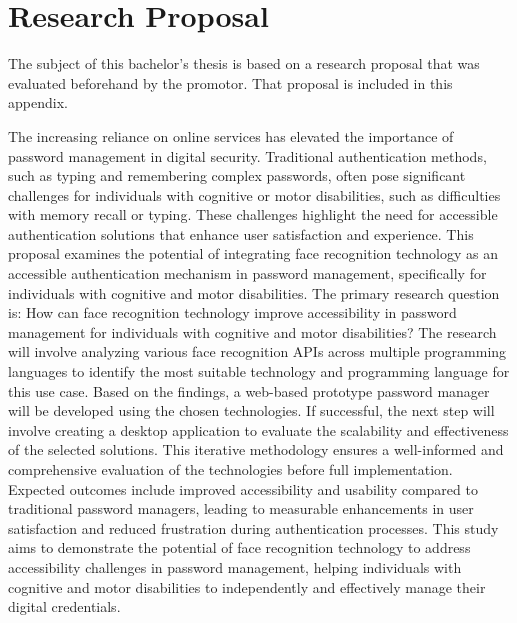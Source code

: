 \documentclass[english,dit,thesis]{hogentreport}
\begin{document}









\appendix

\chapter{Research Proposal}
The subject of this bachelor's thesis is based on a research proposal that was evaluated beforehand by the promotor. That proposal is included in this appendix.


    The increasing reliance on online services has elevated the importance of password management in digital security. Traditional authentication methods, such as typing and remembering complex passwords, often pose significant challenges for individuals with cognitive or motor disabilities, such as difficulties with memory recall or typing. These challenges highlight the need for accessible authentication solutions that enhance user satisfaction and experience. This proposal examines the potential of integrating face recognition technology as an accessible authentication mechanism in password management, specifically for individuals with cognitive and motor disabilities.
    The primary research question is: How can face recognition technology improve accessibility in password management for individuals with cognitive and motor disabilities? The research will involve analyzing various face recognition APIs across multiple programming languages to identify the most suitable technology and programming language for this use case. Based on the findings, a web-based prototype password manager will be developed using the chosen technologies. If successful, the next step will involve creating a desktop application to evaluate the scalability and effectiveness of the selected solutions. This iterative methodology ensures a well-informed and comprehensive evaluation of the technologies before full implementation.
    Expected outcomes include improved accessibility and usability compared to traditional password managers, leading to measurable enhancements in user satisfaction and reduced frustration during authentication processes. This study aims to demonstrate the potential of face recognition technology to address accessibility challenges in password management, helping individuals with cognitive and motor disabilities to independently and effectively manage their digital credentials.
\end{document}
